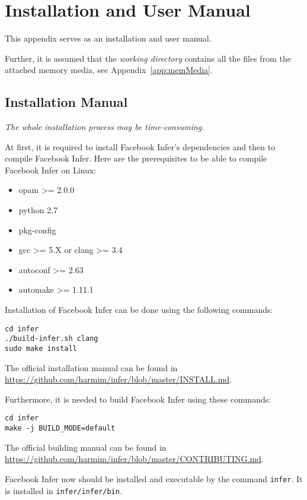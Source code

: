 \chapter{Installation and User Manual}
\label{app:man}

This appendix serves as an installation and user manual.

Further, it is assumed that the \emph{working directory} contains all the
files from the attached memory media, see Appendix~\ref{app:memMedia}.


\section*{Installation Manual}

\emph{The whole installation process may be time-consuming.}

At first, it is required to install Facebook Infer's dependencies and then
to compile Facebook Infer. Here are the prerequisites to be able to compile
Facebook Infer on Linux:
\begin{itemize}
    \item opam >= 2.0.0
    \item python 2.7
    \item pkg-config
    \item gcc >= 5.X or clang >= 3.4
    \item autoconf >= 2.63
    \item automake >= 1.11.1
\end{itemize}

Installation of Facebook Infer can be done using the following commands:
\begin{lstlisting}[style=bash]
cd infer
./build-infer.sh clang
sudo make install
\end{lstlisting}
The official installation manual can be found in
\url{https://github.com/harmim/infer/blob/master/INSTALL.md}.

Furthermore, it is needed to build Facebook Infer using these commands:
\begin{lstlisting}[style=bash]
cd infer
make -j BUILD_MODE=default
\end{lstlisting}
The official building manual can be found in
\url{https://github.com/harmim/infer/blob/master/CONTRIBUTING.md}.

Facebook Infer now should be installed and executable by the command
\texttt{infer}. It is installed in \texttt{infer/infer/bin}.


